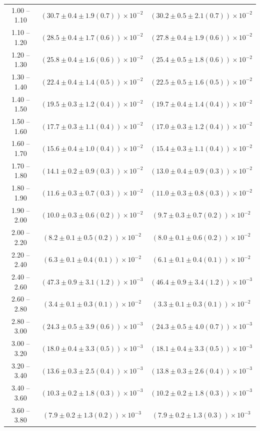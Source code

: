 \begin{table}
\begin{center}
\begin{tabular}{ c | c c }
1.00 -- 1.10 & $(30.7\pm0.4\pm1.9(0.7))\times10^{-2}$ & $(30.2\pm0.5\pm2.1(0.7))\times10^{-2}$ \\ 
1.10 -- 1.20 & $(28.5\pm0.4\pm1.7(0.6))\times10^{-2}$ & $(27.8\pm0.4\pm1.9(0.6))\times10^{-2}$ \\ 
1.20 -- 1.30 & $(25.8\pm0.4\pm1.6(0.6))\times10^{-2}$ & $(25.4\pm0.5\pm1.8(0.6))\times10^{-2}$ \\ 
1.30 -- 1.40 & $(22.4\pm0.4\pm1.4(0.5))\times10^{-2}$ & $(22.5\pm0.5\pm1.6(0.5))\times10^{-2}$ \\ 
1.40 -- 1.50 & $(19.5\pm0.3\pm1.2(0.4))\times10^{-2}$ & $(19.7\pm0.4\pm1.4(0.4))\times10^{-2}$ \\ 
1.50 -- 1.60 & $(17.7\pm0.3\pm1.1(0.4))\times10^{-2}$ & $(17.0\pm0.3\pm1.2(0.4))\times10^{-2}$ \\ 
1.60 -- 1.70 & $(15.6\pm0.4\pm1.0(0.4))\times10^{-2}$ & $(15.4\pm0.3\pm1.1(0.4))\times10^{-2}$ \\ 
1.70 -- 1.80 & $(14.1\pm0.2\pm0.9(0.3))\times10^{-2}$ & $(13.0\pm0.4\pm0.9(0.3))\times10^{-2}$ \\ 
1.80 -- 1.90 & $(11.6\pm0.3\pm0.7(0.3))\times10^{-2}$ & $(11.0\pm0.3\pm0.8(0.3))\times10^{-2}$ \\ 
1.90 -- 2.00 & $(10.0\pm0.3\pm0.6(0.2))\times10^{-2}$ & $(9.7\pm0.3\pm0.7(0.2))\times10^{-2}$ \\ 
2.00 -- 2.20 & $(8.2\pm0.1\pm0.5(0.2))\times10^{-2}$ & $(8.0\pm0.1\pm0.6(0.2))\times10^{-2}$ \\ 
2.20 -- 2.40 & $(6.3\pm0.1\pm0.4(0.1))\times10^{-2}$ & $(6.1\pm0.1\pm0.4(0.1))\times10^{-2}$ \\ 
2.40 -- 2.60 & $(47.3\pm0.9\pm3.1(1.2))\times10^{-3}$ & $(46.4\pm0.9\pm3.4(1.2))\times10^{-3}$ \\ 
2.60 -- 2.80 & $(3.4\pm0.1\pm0.3(0.1))\times10^{-2}$ & $(3.3\pm0.1\pm0.3(0.1))\times10^{-2}$ \\ 
2.80 -- 3.00 & $(24.3\pm0.5\pm3.9(0.6))\times10^{-3}$ & $(24.3\pm0.5\pm4.0(0.7))\times10^{-3}$ \\ 
3.00 -- 3.20 & $(18.0\pm0.4\pm3.3(0.5))\times10^{-3}$ & $(18.1\pm0.4\pm3.3(0.5))\times10^{-3}$ \\ 
3.20 -- 3.40 & $(13.6\pm0.3\pm2.5(0.4))\times10^{-3}$ & $(13.8\pm0.3\pm2.6(0.4))\times10^{-3}$ \\ 
3.40 -- 3.60 & $(10.3\pm0.2\pm1.8(0.3))\times10^{-3}$ & $(10.2\pm0.2\pm1.8(0.3))\times10^{-3}$ \\ 
3.60 -- 3.80 & $(7.9\pm0.2\pm1.3(0.2))\times10^{-3}$ & $(7.9\pm0.2\pm1.3(0.3))\times10^{-3}$ \\ 

\end{tabular}
\end{center}
\end{table}
